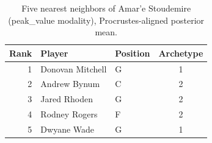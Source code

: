 \begin{table}[htbp]
  \centering\small
  \begin{tabular}{rllc}
    \toprule
    Rank & Player & Position & Archetype \\
    \midrule
    1 & Donovan Mitchell & G & 1 \\
    2 & Andrew Bynum & C & 2 \\
    3 & Jared Rhoden & G & 2 \\
    4 & Rodney Rogers & F & 2 \\
    5 & Dwyane Wade & G & 1 \\
    \bottomrule
  \end{tabular}
  \caption{Five nearest neighbors of Amar'e Stoudemire (peak_value modality), Procrustes-aligned posterior mean.}
  \label{tab:Amar_e_Stoudemire_neighbors_peak_value}
\end{table}

